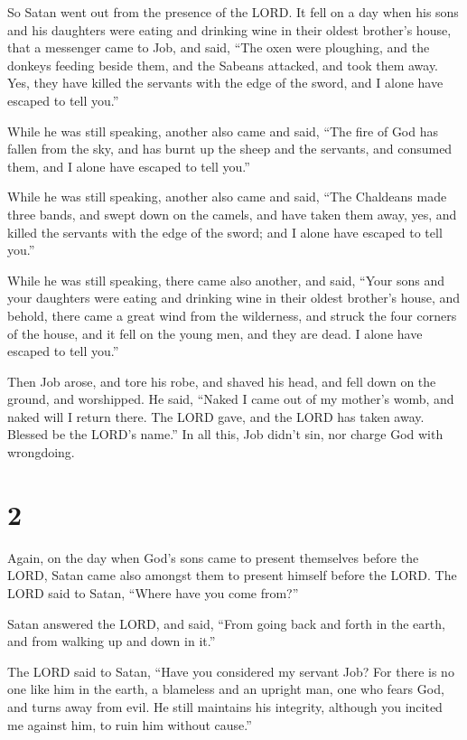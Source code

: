 So Satan went out from the presence of the LORD.  It fell
on a day when his sons and his daughters were eating and drinking wine
in their oldest brother's house,  that a messenger came to
Job, and said, ``The oxen were ploughing, and the donkeys feeding beside
them,  and the Sabeans attacked, and took them away. Yes,
they have killed the servants with the edge of the sword, and I alone
have escaped to tell you.''

 While he was still speaking, another also came and said,
``The fire of God has fallen from the sky, and has burnt up the sheep
and the servants, and consumed them, and I alone have escaped to tell
you.''

 While he was still speaking, another also came and said,
``The Chaldeans made three bands, and swept down on the camels, and have
taken them away, yes, and killed the servants with the edge of the
sword; and I alone have escaped to tell you.''

 While he was still speaking, there came also another, and
said, ``Your sons and your daughters were eating and drinking wine in
their oldest brother's house,  and behold, there came a
great wind from the wilderness, and struck the four corners of the
house, and it fell on the young men, and they are dead. I alone have
escaped to tell you.''

 Then Job arose, and tore his robe, and shaved his head,
and fell down on the ground, and worshipped.  He said,
``Naked I came out of my mother's womb, and naked will I return there.
The LORD gave, and the LORD has taken away. Blessed be the LORD's
name.''  In all this, Job didn't sin, nor charge God with
wrongdoing.

\hypertarget{section-1}{%
\section{2}\label{section-1}}

 Again, on the day when God's sons came to present
themselves before the LORD, Satan came also amongst them to present
himself before the LORD.  The LORD said to Satan, ``Where
have you come from?''

Satan answered the LORD, and said, ``From going back and forth in the
earth, and from walking up and down in it.''

 The LORD said to Satan, ``Have you considered my servant
Job? For there is no one like him in the earth, a blameless and an
upright man, one who fears God, and turns away from evil. He still
maintains his integrity, although you incited me against him, to ruin
him without cause.''

